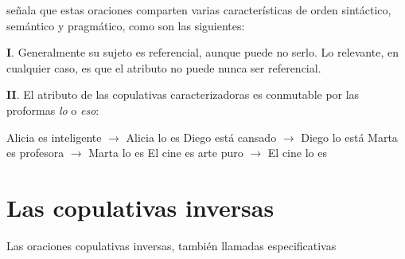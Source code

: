 {}\textcite{Leborans1999Predicacion} señala que estas oraciones comparten varias características de orden sintáctico, semántico y pragmático, como son las siguientes:


\textbf{I}. Generalmente su sujeto es referencial, aunque puede no serlo. Lo relevante, en cualquier caso, es que el atributo no puede nunca ser referencial.

\textbf{II}. El atributo de las copulativas caracterizadoras es conmutable por las proformas \textit{lo} o \textit{eso}:

\pex
\a Alicia es inteligente $\longrightarrow$ Alicia lo es
\a Diego está cansado $\longrightarrow$ Diego lo está
\a Marta es profesora $\longrightarrow$ Marta lo es
\a El cine es arte puro $\longrightarrow$ El cine lo es
\xe




\section{Las copulativas inversas}

Las oraciones copulativas inversas, también llamadas especificativas 
